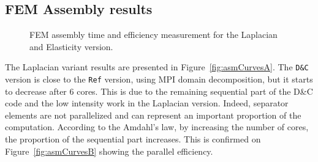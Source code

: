 \documentclass[10pt]{IOS-Book-Article}
\begin{document}
\subsection{FEM Assembly results}
\begin{figure}[htp]
 \caption{FEM assembly time and efficiency measurement for the Laplacian and Elasticity version.}
 \label{fig:asmCurves}
\end{figure}

The Laplacian variant results are presented in Figure~\ref{fig:asmCurvesA}. The {\tt D\&C} version is close to the {\tt Ref} version, using MPI domain decomposition, but it starts to decrease after 6 cores.
This is due to the remaining sequential part of the D\&C code and the low intensity work in the Laplacian version.
Indeed, separator elements are not parallelized and can represent an important proportion of the computation.
According to the Amdahl's law, by increasing the number of cores, the proportion of the sequential part increases.
This is confirmed on Figure~\ref{fig:asmCurvesB} showing the parallel efficiency.
\end{document}
